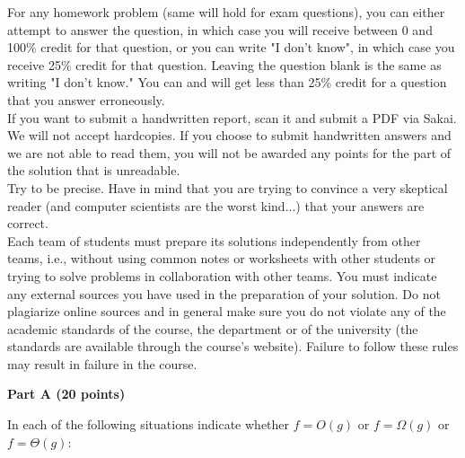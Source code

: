 \documentclass{article}
\begin{document}
 For any homework problem (same will hold
for exam questions), you can either attempt to answer the question, in
which case you will receive between 0 and 100\% credit for that
question, or you can write "I don't know", in which case you receive
25\% credit for that question. Leaving the question blank is the same
as writing "I don't know." You can and will get less than 25\% credit
for a question that you answer erroneously.\\

 If you want to submit a
handwritten report, scan it and submit a PDF via Sakai. We will not
accept hardcopies. If you choose to submit handwritten answers and we
are not able to read them, you will not be awarded any points for the
part of the solution that is unreadable.\\

 Try to be precise. Have in mind that you
are trying to convince a very skeptical reader (and computer
scientists are the worst kind...) that your answers are correct.\\

 Each team of students
must prepare its solutions independently from other teams, i.e.,
without using common notes or worksheets with other students or trying
to solve problems in collaboration with other teams.  You must
indicate any external sources you have used in the preparation of your
solution. Do not plagiarize online sources and in general make sure
you do not violate any of the academic standards of the course, the
department or of the university (the standards are available through
the course's website). Failure to follow these rules may result in
failure in the course.\\


\newpage

\vspace{0.1in}

{\bf }

\begin{center}
{\bf Part A (20 points)}
\end{center}

 In each of the following situations
indicate whether $f=O(g)$ or $f=\Omega(g)$ or $f=\Theta(g)$:
\end{document}
